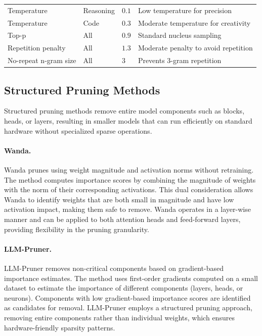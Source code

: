 \begin{table}[!t]
{\begin{tabular}{>{\raggedright\arraybackslash}p{3.2cm}>{\centering\arraybackslash}p{2.3cm}>{\centering\arraybackslash}p{1.8cm}>{\raggedright\arraybackslash}p{4.9cm}}
Temperature & Reasoning & $0.1$ & Low temperature for precision \\
Temperature & Code & $0.3$ & Moderate temperature for creativity \\
Top-p & All & $0.9$ & Standard nucleus sampling \\
Repetition penalty & All & $1.3$ & Moderate penalty to avoid repetition \\
No-repeat n-gram size & All & $3$ & Prevents 3-gram repetition \\
\bottomrule
\end{tabular}
}

\label{tab:hyperparameters_combined}
\end{table}

\subsection{Structured Pruning Methods}

Structured pruning methods remove entire model components such as blocks, heads, or layers, resulting in smaller models that can run efficiently on standard hardware without specialized sparse operations.

\paragraph{Wanda.}
Wanda \cite{sun2023wanda} prunes using weight magnitude and activation norms without retraining. The method computes importance scores by combining the magnitude of weights with the norm of their corresponding activations. This dual consideration allows Wanda to identify weights that are both small in magnitude and have low activation impact, making them safe to remove. Wanda operates in a layer-wise manner and can be applied to both attention heads and feed-forward layers, providing flexibility in the pruning granularity.

\paragraph{LLM-Pruner.}
LLM-Pruner \cite{llmpruner2023} removes non-critical components based on gradient-based importance estimates. The method uses first-order gradients computed on a small dataset to estimate the importance of different components (layers, heads, or neurons). Components with low gradient-based importance scores are identified as candidates for removal. LLM-Pruner employs a structured pruning approach, removing entire components rather than individual weights, which ensures hardware-friendly sparsity patterns.

